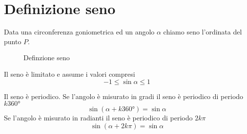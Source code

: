 \section{Definizione seno}\label{sec:definizione-seno}
\begin{defn}
Data una circonferenza goniometrica ed un angolo $\alpha$ chiamo seno l'ordinata del punto $P$.
\end{defn}
%	
\begin{figure}
	\centering
	
	\caption{Definzione seno}
	\label{fig:senodefinizione}
\end{figure}
\begin{prop}\label{prop:senolimitato}
	Il seno è limitato
e	assume i valori compresi
	\begin{equation*}
	-1\leq \sin\alpha \leq 1
	\end{equation*}
\end{prop}
\begin{prop}\label{Prop:periodoseno}
	Il seno è periodico. 
	Se l'angolo è misurato in gradi il seno è periodico di periodo $k\ang{360}$
	\begin{equation*}
	\sin(\alpha+k\ang{360;;})=\sin\alpha
	\end{equation*}
	Se l'angolo è misurato in radianti il seno è periodico di periodo $2k\pi$
	\begin{equation*}
	\sin(\alpha+2k\pi)=\sin\alpha
	\end{equation*}
\end{prop}
